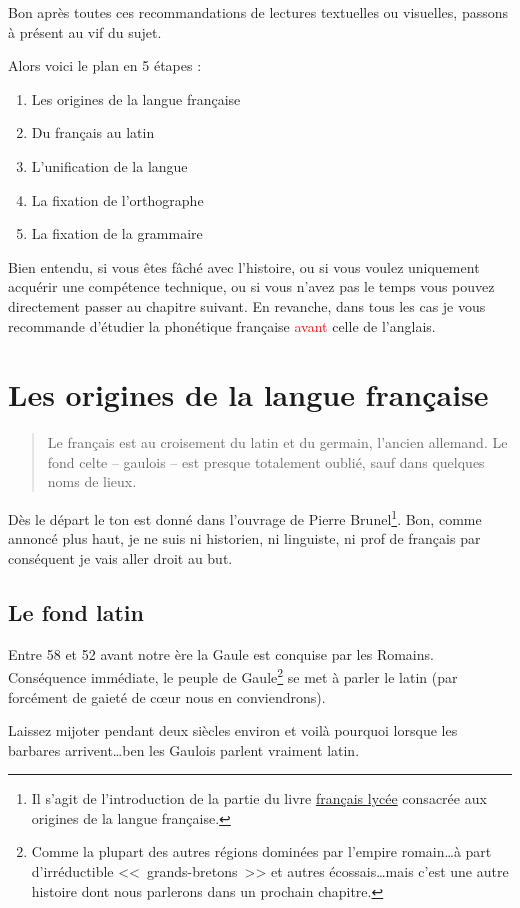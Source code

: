 \documentclass[12pt,a4paper]{book}
\begin{document}
Bon après toutes ces recommandations de lectures textuelles ou
visuelles, passons à présent au vif du sujet.\par

Alors voici le plan en 5 étapes :
\begin{enumerate}
\item Les origines de la langue française
\item Du français au latin
\item L'unification de la langue
\item La fixation de l'orthographe
\item La fixation de la grammaire
\end{enumerate}

Bien entendu, si vous êtes fâché avec l'histoire, ou si vous voulez
uniquement acquérir une compétence technique, ou si vous n'avez pas le
temps vous pouvez directement passer au chapitre suivant. En revanche,
dans tous les cas je vous recommande d'étudier la phonétique française
\textcolor{red}{avant} celle de l'anglais.

\section{Les origines de la langue française}\label{sec:orgfr}

\begin{quote}
  Le français est au croisement du latin et du germain, l'ancien
  allemand. Le fond celte -- gaulois -- est presque totalement oublié,
  sauf dans quelques noms de lieux.
\end{quote}

Dès le départ le ton est donné dans l'ouvrage de Pierre
Brunel\footnote{Il s'agit de l'introduction  de la partie du livre \href{https://www.amazon.fr/gp/product/2844100015/ref=as\_li\_tl?ie=UTF8\&camp=1642\&creative=6746\&creativeASIN=2844100015\&linkCode=as2\&tag=wwwbecomefree-21\&linkId=985f3a849fd44728e8480993cf2d5490}{français
  lycée} consacrée aux origines de la langue française.}. Bon, comme
annoncé plus haut, je ne suis ni historien, ni linguiste, ni prof de
français par conséquent je vais aller droit au but.\par
\subsection{Le fond latin}\label{subsec:lat}
Entre 58 et 52 avant notre ère la Gaule est conquise par les
Romains. Conséquence immédiate, le peuple de Gaule\footnote{Comme la
  plupart des autres régions dominées par l'empire romain\dots à part
  d'irréductible <<~grands-bretons~>> et autres écossais\dots mais
  c'est une autre histoire dont nous parlerons dans un prochain
  chapitre.} se met à parler le latin (par forcément de gaieté de
c{\oe}ur nous en conviendrons).\par
Laissez mijoter pendant deux siècles environ et voilà pourquoi lorsque
les barbares arrivent\dots ben les Gaulois parlent vraiment latin.
\end{document}

